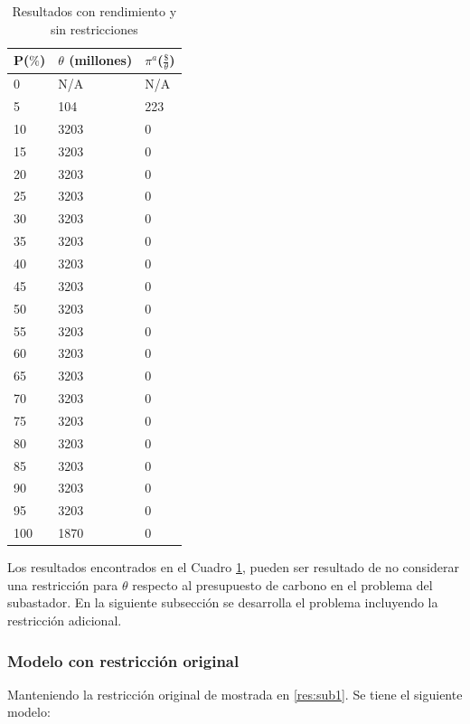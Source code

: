 \begin{table}[H]
\centering
\begin{tabular}{|l|l|l|}
\hline
\textbf{P($\%$)} & \textbf{$\theta$ (millones)} & \textbf{$\pi^a$($\frac{\$}{\theta}$)} \\ \hline
0 & N/A & N/A \\ \hline
5 & 104 & 223 \\ \hline
10 & 3203 & 0 \\ \hline
15 & 3203 & 0 \\ \hline
20 & 3203 & 0 \\ \hline
25 & 3203 & 0 \\ \hline
30 & 3203 & 0 \\ \hline
35 & 3203 & 0 \\ \hline
40 & 3203 & 0 \\ \hline
45 & 3203 & 0 \\ \hline
50 & 3203 & 0 \\ \hline
55 & 3203 & 0 \\ \hline
60 & 3203 & 0 \\ \hline
65 & 3203 & 0 \\ \hline
70 & 3203 & 0 \\ \hline
75 & 3203 & 0 \\ \hline
80 & 3203 & 0 \\ \hline
85 & 3203 & 0 \\ \hline
90 & 3203 & 0 \\ \hline
95 & 3203 & 0 \\ \hline
100 & 1870 & 0 \\ \hline
\end{tabular}
\caption{Resultados con rendimiento y sin restricciones}
\label{tabla:sinrestr}
\end{table}


Los resultados encontrados en el Cuadro \ref{tabla:sinrestr}, pueden ser resultado de no considerar una restricción para $\theta$ respecto al presupuesto de carbono en el problema del subastador. En la siguiente subsección se desarrolla el problema incluyendo la restricción adicional.

\subsubsection{Modelo con restricción original}

Manteniendo la restricción original de  mostrada en \ref{res:sub1}. Se tiene el siguiente modelo:

